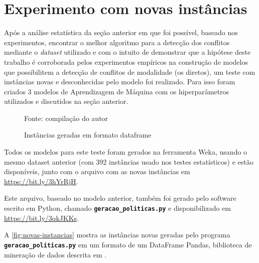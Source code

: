\section{Experimento com novas instâncias}\label{exp:novas-instancias}
Após a análise estatística da seção anterior em que foi possível, baseado nos experimentos, encontrar o melhor algoritmo para a detecção dos conflitos mediante o \textit{dataset} utilizado e com o intuito de demonstrar que a hipótese deste trabalho é corroborada pelos experimentos empíricos na construção de modelos que possibilitem a detecção de conflitos de modalidade (os diretos), um teste com instâncias novas e desconhecidas pelo modelo foi realizado. Para isso foram criados 3 modelos de Aprendizagem de Máquina com os hiperparâmetros utilizados e discutidos na seção anterior. 

\begin{figure}[H]
	\centering
	\caption{Instâncias geradas em formato dataframe}
	
	\label{fig:novas-instancias}
	{\scriptsize Fonte: compilação do autor}
\end{figure}

Todos os modelos para este teste foram gerados na ferramenta Weka, usando o mesmo dataset anterior (com 392 instâncias usado nos testes estatísticos) e estão disponíveis, junto com o arquivo com as novas instâncias em \url{https://bit.ly/3hYrRjH}. 

Este arquivo, baseado no modelo anterior, também foi gerado pelo software  escrito em Python, chamado \texttt{\textbf{geracao\_politicas.py}}  e disponibilizado em \url{https://bit.ly/3qkJKKs}. 

A \autoref{fig:novas-instancias} mostra as instâncias novas geradas pelo programa \texttt{\textbf{geracao\_politicas.py}} em um formato de um DataFrame Pandas, biblioteca de mineração de dados descrita em . 

